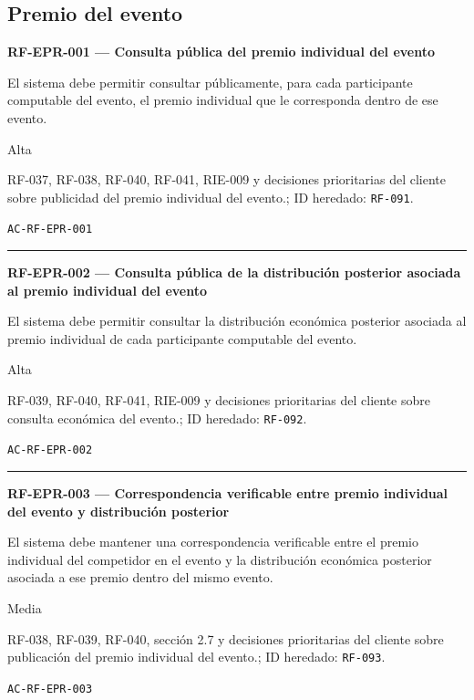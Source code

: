 \documentclass[10pt,letterpaper]{article}
\begin{document}
\subsection{Premio del evento}
\noindent\textbf{RF-EPR-001 --- Consulta pública del premio individual del evento}\par
\begin{description}[style=nextline,leftmargin=3.15cm,labelwidth=2.8cm,font=\normalfont\bfseries]
\item[Obligación] El sistema debe permitir consultar públicamente, para cada participante computable del evento, el premio individual que le corresponda dentro de ese evento.
\item[Prioridad] Alta
\item[Procedencia] RF-037, RF-038, RF-040, RF-041, RIE-009 y decisiones prioritarias del cliente sobre publicidad del premio individual del evento.; ID heredado: \texttt{RF-091}.
\item[Verificación] \texttt{AC-RF-EPR-001}
\end{description}
\vspace{0.25em}\hrule\vspace{0.65em}
\noindent\textbf{RF-EPR-002 --- Consulta pública de la distribución posterior asociada al premio individual del evento}\par
\begin{description}[style=nextline,leftmargin=3.15cm,labelwidth=2.8cm,font=\normalfont\bfseries]
\item[Obligación] El sistema debe permitir consultar la distribución económica posterior asociada al premio individual de cada participante computable del evento.
\item[Prioridad] Alta
\item[Procedencia] RF-039, RF-040, RF-041, RIE-009 y decisiones prioritarias del cliente sobre consulta económica del evento.; ID heredado: \texttt{RF-092}.
\item[Verificación] \texttt{AC-RF-EPR-002}
\end{description}
\vspace{0.25em}\hrule\vspace{0.65em}
\noindent\textbf{RF-EPR-003 --- Correspondencia verificable entre premio individual del evento y distribución posterior}\par
\begin{description}[style=nextline,leftmargin=3.15cm,labelwidth=2.8cm,font=\normalfont\bfseries]
\item[Obligación] El sistema debe mantener una correspondencia verificable entre el premio individual del competidor en el evento y la distribución económica posterior asociada a ese premio dentro del mismo evento.
\item[Prioridad] Media
\item[Procedencia] RF-038, RF-039, RF-040, sección 2.7 y decisiones prioritarias del cliente sobre publicación del premio individual del evento.; ID heredado: \texttt{RF-093}.
\item[Verificación] \texttt{AC-RF-EPR-003}
\end{description}
\end{document}
